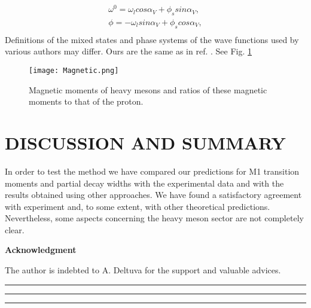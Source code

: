 \documentclass[12pt,epsf]{article}
\newcommand{\xiaosi}{\fontsize{12pt}{14.4pt}\selectfont}
\begin{document}
\begin{multicols}{2}
\begin{equation}
\begin{split}
\omega^0=\omega_l cos\alpha_V+\phi_s sin\alpha_V, \\
\phi=-\omega_l sin\alpha_V+\phi_s cos\alpha_V,\\
\end{split} 
\end{equation}
Definitions of the mixed states and phase systems of the wave functions used by various authors may differ.  Ours are the same as in ref. \cite{Navarro:1984ha}. See Fig. \ref{Magnetic} 
\begin{figure}[H]
\begin{center}
  \texttt{[image: Magnetic.png]}
  \renewcommand{\figurename}{Fig.}%
  \caption{\footnotesize Magnetic moments of heavy mesons and ratios of these magnetic moments to that of the proton.}\label{Magnetic}%
\end{center}
\end{figure}


\section{\small\bf DISCUSSION AND SUMMARY}

\xiaosi In order to test the method we have compared our predictions for M1 transition moments and partial decay widths with the experimental data and with the results obtained using other approaches. We have found a satisfactory agreement with experiment and, to some extent, with other theoretical predictions. Nevertheless, some aspects concerning the heavy meson sector are not completely clear. 
\begin{center}
\vskip1.0cm{\bf Acknowledgment}
\end{center}

The author is indebted to A. Deltuva for the support and valuable advices.
\end{multicols}
\begin{center}
\noindent\rule{8cm}{1pt}
\vskip -0.5cm
\noindent\rule{4cm}{1.5pt}
\vskip -0.5cm
\noindent\rule{2cm}{1.8pt}
\end{center}
\end{document}
